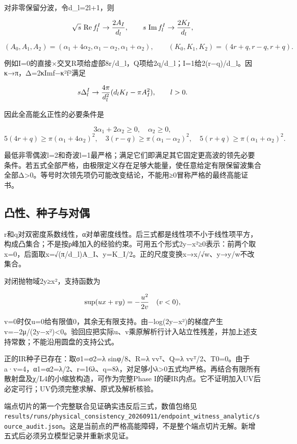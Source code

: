\documentclass[
  10pt,
  a4paper,
]{article}
\begin{document}
对非零保留分波，令d\_l=2l+1，则

\[
\sqrt{s}\,\operatorname{Re}f_l^I\to{2A_I\over d_l},
\qquad s\,\operatorname{Im}f_l^I\to{2K_I\over d_l},
\]

\[
(A_0,A_1,A_2)=(\alpha_1+4\alpha_2,\alpha_1-\alpha_2,\alpha_1+\alpha_2),
\qquad(K_0,K_1,K_2)=(4r+q,r-q,r+q).
\]

例如I=0的直接×交叉R项给虚部8r/d\_l，Q项给2q/d\_l；I=1给2(r−q)/d\_l。因κ→π，Δ=2κImf−κ²\textbar f\textbar²满足

\[
s\Delta_l^I\to {4\pi\over d_l^2}(d_lK_I-\pi A_I^2),\qquad l>0.
\]

因此全高能幺正性的必要条件是

\[
3\alpha_1+2\alpha_2\ge0,\quad\alpha_2\ge0,
\] \[
5(4r+q)\ge\pi(\alpha_1+4\alpha_2)^2,
\quad3(r-q)\ge\pi(\alpha_1-\alpha_2)^2,
\quad5(r+q)\ge\pi(\alpha_1+\alpha_2)^2.
\]

最低非零偶波l=2和奇波l=1最严格；满足它们即满足其它固定更高波的领先必要条件。若五式全部严格，由极限定义存在足够大能量，使任意给定有限保留波集合全部Δ\textgreater0。等号时次领先项仍可能改变结论，不能用≥0冒称严格的最终高能证书。

\subsection{凸性、种子与对偶}\label{ux51f8ux6027ux79cdux5b50ux4e0eux5bf9ux5076}

r和q对双密度系数线性，α对单密度线性。后三式都是线性项不小于线性项平方，构成凸集合；不是按ρ峰加入的经验约束。可用五个形式2y−x²≥0表示：前两个取x=0，后面取x=√(π/d\_l)A\_I、y=K\_I/2。正的尺度变换x→x/√w、y→y/w不改集合。

对闭抛物域2y≥x²，支持函数为

\[
\sup (u x+v y)=-{u^2\over2v}\quad(v<0),
\]

v=0时仅u=0给有限值0，其余无有限支持。由−log(2y−x²)的梯度产生v=−2μ/(2y−x²)\textless0。验回应把实际u、v乘原解析行计入站立性残差，并加上述支持常数；不能沿用圆盘的支持公式。

正的IR种子已存在：取σ1=σ2=λ sinφ/8、R=λ vvᵀ、Q=λ
vvᵀ/2、T0=0。由于a·v=4，α1=α2=λ/2、r=16λ、q=8λ，对足够小λ\textgreater0五式均严格。再结合有限所有散射盘及χ/L4的小缩放构造，可作为完整Phase
I的硬IR内点。它不证明加入UV后必定可行；UV仍须完整求解、原式及解析核验。

端点切片的第一个完整联合见证确实违反后三式，数值包络见\texttt{results/runs/physical\_consistency\_20260911/endpoint\_witness\_analytic/source\_audit.json}。这是当前点的严格高能障碍，不是整个端点切片无解。新增五式后必须另立模型记录并重新求见证。
\end{document}
